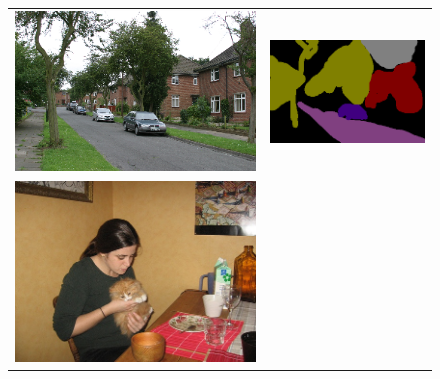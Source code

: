 \begin{figure}[t]
    \begin{center}
    \begin{tabu} to 0.8
    \includegraphics[width=\linewidth]{msrc_scene}&%
    \includegraphics[width=\linewidth]{msrc_scene_GT}\\
    \includegraphics[width=\linewidth]{pascal}&%

\end{tabu}
\end{center}
\end{figure}
